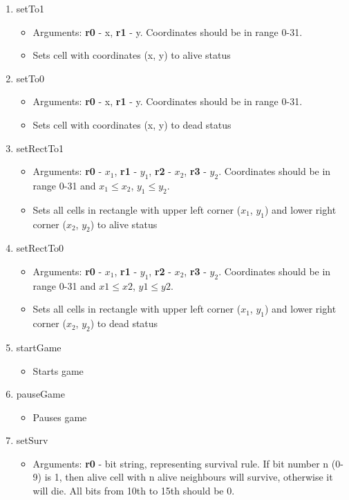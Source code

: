 \begin{enumerate}
	\item setTo1
		\begin{itemize}
			\item Arguments: \textbf{r0} - x, \textbf{r1} - y. Coordinates should be in range 0-31.
			\item Sets cell with coordinates (x, y) to alive status
		\end{itemize}
	\item setTo0
		\begin{itemize}
			\item Arguments: \textbf{r0} - x, \textbf{r1} - y. Coordinates should be in range 0-31.
			\item Sets cell with coordinates (x, y) to dead status
		\end{itemize}
	\item setRectTo1
		\begin{itemize}
			\item Arguments: \textbf{r0} - $x_{1}$, \textbf{r1} - $y_{1}$, \textbf{r2} - $x_{2}$, \textbf{r3} - $y_{2}$. Coordinates should be in range 0-31 and $x_{1} \leq x_{2}$, $y_{1} \leq y_{2}$.
			\item Sets all cells in rectangle with upper left corner ($x_{1}$, $y_{1}$) and lower right corner ($x_{2}$, $y_{2}$) to alive status
		\end{itemize}
	\item setRectTo0
		\begin{itemize}
			\item Arguments: \textbf{r0} - $x_{1}$, \textbf{r1} - $y_{1}$, \textbf{r2} - $x_{2}$, \textbf{r3} - $y_{2}$. Coordinates should be in range 0-31 and $x1 \leq x2$, $y1 \leq y2$.
			\item Sets all cells in rectangle with upper left corner ($x_{1}$, $y_{1}$) and lower right corner ($x_{2}$, $y_{2}$) to dead status
		\end{itemize}
	\item startGame
		\begin{itemize}
			\item Starts game
		\end{itemize}
	\item pauseGame
		\begin{itemize}
			\item Pauses game
		\end{itemize}
	\item setSurv
		\begin{itemize}
			\item Arguments: \textbf{r0} - bit string, representing survival rule. If bit number n (0-9) is 1, then alive cell with n alive neighbours will survive, otherwise it will die. All bits from 10th to 15th should be 0.

\end{itemize}
\end{enumerate}
